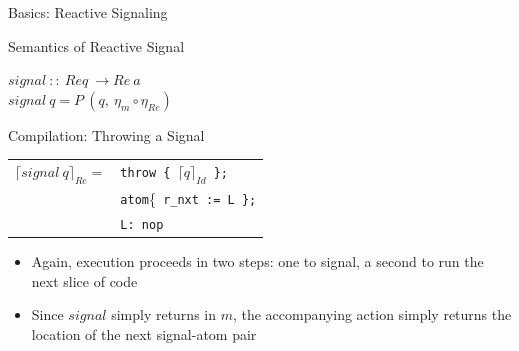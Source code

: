 \documentclass{beamer}
\begin{document}
\begin{frame}{Basics: Reactive Signaling}

\begin{structure}{Semantics of Reactive Signal}

\begin{onlinebox}{7cm}

$signal\ ::\ Req\ \rightarrow Re\ a$\\
$signal\ q = P\ (q,\ \eta_m \circ \eta_{Re})$\\

\end{onlinebox}

\end{structure}

\bigskip

\begin{structure}{Compilation: Throwing a Signal}
\begin{onlinebox}{9cm}

\begin{tabular}[t]{ll}
$\lceil signal\ q \rceil_{Re} =$ &\texttt{throw \{ $\lceil q \rceil_{Id}$ \};}\\
&\texttt{atom}\{\texttt{ r\_nxt := L \};}\\
&\texttt{L: nop} \\

\end{tabular}

\end{onlinebox}

\begin{itemize}

\item{Again, execution proceeds in two steps: one to signal, a second to run the next slice of code}

\item{Since $signal$ simply returns in $m$, the accompanying action simply returns the location of the next signal-atom pair}

\end{itemize}

\end{structure}


\end{frame}

\end{document}

